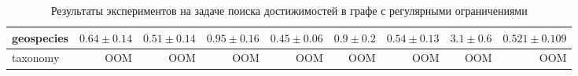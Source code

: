 \begin{landscape}
\begin{table}[]
{\begin{tabular}{|l|rrrrrrrr|}
geospecies &
  \multicolumn{1}{r|}{$0.64 \pm 0.14$} &
  \multicolumn{1}{r|}{$0.51 \pm 0.14$} &
  \multicolumn{1}{r|}{$0.95 \pm 0.16$} &
  \multicolumn{1}{r|}{$0.45 \pm 0.06$} &
  \multicolumn{1}{r|}{$0.9 \pm 0.2$} &
  \multicolumn{1}{r|}{$0.54 \pm 0.13$} &
  \multicolumn{1}{r|}{$3.1 \pm 0.6$} &
  $0.521 \pm 0.109$ \\ \hline
taxonomy &
  \multicolumn{1}{r|}{OOM} &
  \multicolumn{1}{r|}{OOM} &
  \multicolumn{1}{r|}{OOM} &
  \multicolumn{1}{r|}{OOM} &
  \multicolumn{1}{r|}{OOM} &
  \multicolumn{1}{r|}{OOM} &
  \multicolumn{1}{r|}{OOM} &
  OOM \\ \hline
\end{tabular}%
}
\caption{Результаты экспериментов на задаче поиска достижимостей в графе с регулярными ограничениями}
\label{tab:rdf_regs}
\end{table}
\end{landscape}